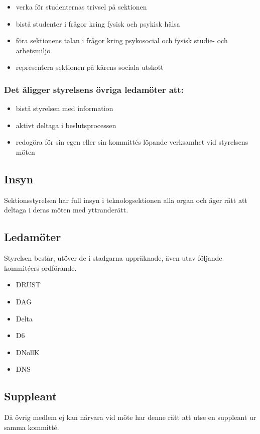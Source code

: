 \begin{itemize}
    \item verka för studenternas trivsel på sektionen
    \item bistå studenter i frågor kring fysisk och psykisk hälsa
    \item föra sektionens talan i frågor kring psykosocial och fysisk studie- och arbetsmiljö
    \item representera sektionen på kårens sociala utskott
\end{itemize}

\subsubsection{Det åligger styrelsens övriga ledamöter att:}

\begin{itemize}
  \item bistå styrelsen med information 
  \item aktivt deltaga i beslutsprocessen 
  \item redogöra för sin egen eller sin kommittés löpande verksamhet vid styrelsens möten 
\end{itemize}

\subsection{Insyn} 

Sektionsstyrelsen har full insyn i teknologsektionen alla organ och äger rätt att deltaga i deras möten med yttranderätt. 

\subsection{Ledamöter}
Styrelsen består, utöver de i stadgarna uppräknade, även utav följande kommitéers ordförande. 
\begin{itemize}
  \item DRUST 
  \item DAG 
  \item Delta 
  \item D6 
  \item DNollK
  \item DNS
\end{itemize}

\subsection{Suppleant}
Då övrig medlem ej kan närvara vid möte har denne rätt att utse en suppleant ur samma kommitté.

